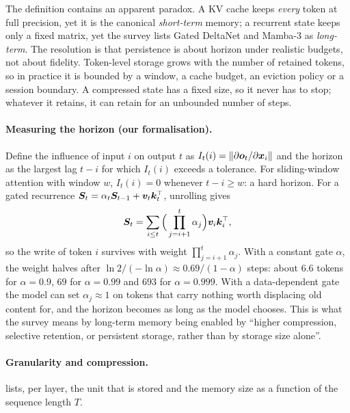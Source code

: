 The definition contains an apparent paradox. A KV cache keeps \emph{every} token at full
precision, yet it is the canonical \emph{short-term} memory; a recurrent state keeps only a fixed
matrix, yet the survey lists Gated DeltaNet and Mamba-3 as \emph{long-term}. The resolution is
that persistence is about horizon under realistic budgets, not about fidelity. Token-level storage
grows with the number of retained tokens, so in practice it is bounded by a window, a cache
budget, an eviction policy or a session boundary. A compressed state has a fixed size, so it never
has to stop; whatever it retains, it can retain for an unbounded number of steps.

\paragraph{Measuring the horizon (our formalisation).} Define the influence of input $i$ on output
$t$ as $I_t(i) = \left\lVert \partial\bm{o}_t/\partial\bm{x}_i\right\rVert$ and the horizon as the largest lag $t - i$
for which $I_t(i)$ exceeds a tolerance. For sliding-window attention with window $w$, $I_t(i) = 0$
whenever $t - i \ge w$: a hard horizon. For a gated recurrence
$\bm{S}_t = \alpha_t\bm{S}_{t-1} + \bm{v}_t\bm{k}_t^{\top}$, unrolling gives
\begin{equation}\label{eq:c02-decay-unroll}
  \bm{S}_t = \sum_{i \le t}\Big(\prod_{j=i+1}^{t}\alpha_j\Big)\bm{v}_i\bm{k}_i^{\top},
\end{equation}
so the write of token $i$ survives with weight $\prod_{j=i+1}^{t}\alpha_j$. With a constant gate
$\alpha$, the weight halves after $\ln 2/(-\ln\alpha) \approx 0.69/(1-\alpha)$ steps: about $6.6$
tokens for $\alpha = 0.9$, $69$ for $\alpha = 0.99$ and $693$ for $\alpha = 0.999$. With a
data-dependent gate the model can set $\alpha_j \approx 1$ on tokens that carry nothing worth
displacing old content for, and the horizon becomes as long as the model chooses. This is what
the survey means by long-term memory being enabled by ``higher compression, selective retention,
or persistent storage, rather than by storage size alone''.

\paragraph{Granularity and compression.}  lists, per layer, the unit that
is stored and the memory size as a function of the sequence length $T$.

